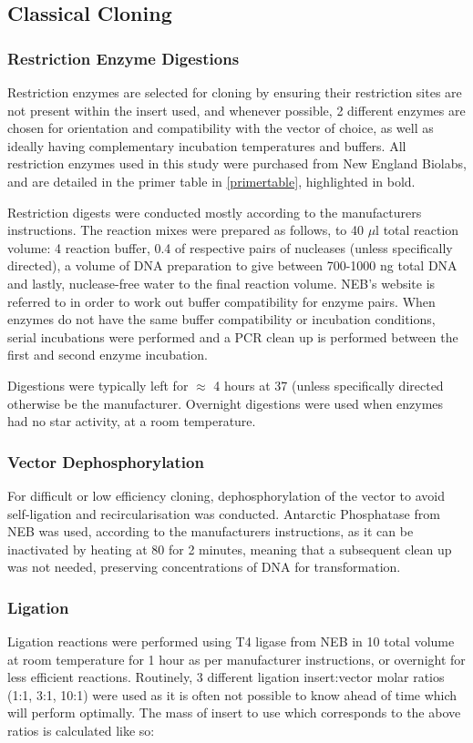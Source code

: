 \subsection{Classical Cloning}
	\subsubsection{Restriction Enzyme Digestions}\label{digestion}
	Restriction enzymes are selected for cloning by ensuring their restriction sites are not present within the insert used, and whenever possible, 2 different enzymes are chosen for orientation and compatibility with the vector of choice, as well as ideally having complementary incubation temperatures and buffers. All restriction enzymes used in this study were purchased from New England Biolabs, and are detailed in the primer table in \vref{primertable}, highlighted in bold.
	
	Restriction digests were conducted mostly according to the manufacturers instructions. The reaction mixes were prepared as follows, to 40 $\mu$l total reaction volume: 4\ul{} reaction buffer, 0.4\ul{} of respective pairs of nucleases (unless specifically directed), a volume of DNA preparation to give between 700-1000 ng total DNA and lastly, nuclease-free water to the final reaction volume. NEB's website is referred to in order to work out buffer compatibility for enzyme pairs. When enzymes do not have the same buffer compatibility or incubation conditions, serial incubations were performed and a PCR clean up is performed between the first and second enzyme incubation.
	
	Digestions were typically left for $\approx$ 4 hours at 37\degC{} (unless specifically directed otherwise be the manufacturer. Overnight digestions were used when enzymes had no star activity, at a room temperature.

	\subsubsection{Vector Dephosphorylation}
	For difficult or low efficiency cloning, dephosphorylation of the vector to avoid self-ligation and recircularisation was conducted. Antarctic Phosphatase from NEB was used, according to the manufacturers instructions, as it can be inactivated by heating at 80\degC{} for 2 minutes, meaning that a subsequent clean up was not needed, preserving concentrations of DNA for transformation.

	\subsubsection{Ligation}
Ligation reactions were performed using T4 ligase from NEB in 10\ul{} total volume at room temperature for 1 hour as per manufacturer instructions, or overnight for less efficient reactions. Routinely, 3 different ligation insert:vector molar ratios (1:1, 3:1, 10:1) were used as it is often not possible to know ahead of time which will perform optimally. The mass of insert to use which corresponds to the above ratios is calculated like so:\\


